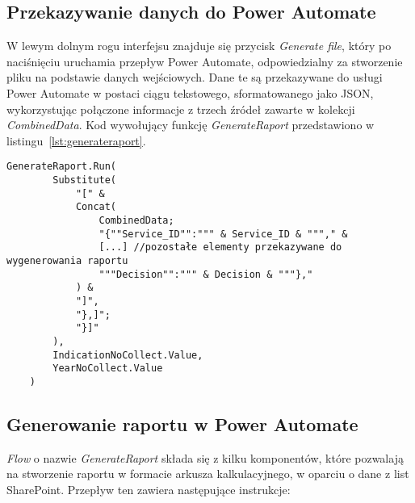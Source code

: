 \subsection{Przekazywanie danych do Power Automate}

W lewym dolnym rogu interfejsu znajduje się przycisk \emph{Generate file}, który po naciśnięciu uruchamia przepływ Power Automate, odpowiedzialny za stworzenie pliku na podstawie danych wejściowych. Dane te są przekazywane do usługi Power Automate w postaci ciągu tekstowego, sformatowanego jako JSON, wykorzystując połączone informacje z trzech źródeł zawarte w kolekcji \emph{CombinedData}. Kod wywołujący funkcję \emph{GenerateRaport} przedstawiono w listingu~\ref{lst:generateraport}.

\begin{lstlisting}[language=PowerFx, caption={Kod wywołujący funkcję GenerateRaport}, label={lst:generateraport}]
    GenerateRaport.Run(
        Substitute(
            "[" & 
            Concat(
                CombinedData;
                "{""Service_ID"":""" & Service_ID & """," &
                [...] //pozostałe elementy przekazywane do wygenerowania raportu
                """Decision"":""" & Decision & """},"
            ) & 
            "]",
            "},]"; 
            "}]"
        ),
        IndicationNoCollect.Value,
        YearNoCollect.Value
    )
    \end{lstlisting}



\subsection{Generowanie raportu w Power Automate}


\emph{Flow} o nazwie \emph{GenerateRaport} składa się z kilku komponentów, które
pozwalają na stworzenie raportu w formacie arkusza kalkulacyjnego, w oparciu o dane z list SharePoint. Przepływ ten zawiera następujące instrukcje:

